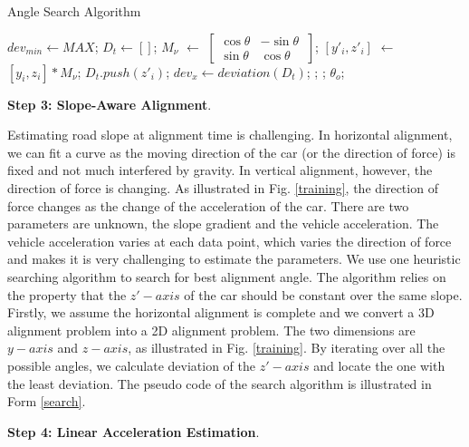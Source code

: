 \begin{algorithm}
\caption{Angle Search Algorithm}
\label{search}
\begin{algorithmic}[1]
\State $dev_{min} \gets MAX$;
\State $D_{t} \gets []$;
\State $M_\nu$ $\gets$ $\begin{bmatrix}\cos\theta & -\sin\theta\ \\ \sin\theta & \cos\theta \end{bmatrix}$;
\State $[y'_i,z'_i]$ $\gets$ $[y_i,z_i]* M_\nu$;
\State $D_t.push(z'_i)$;
\EndFor
\State $dev_x \gets deviation(D_t)$;
;
;
\EndIf
\EndFor
\Return $\theta_{o}$;
\EndProcedure
\end{algorithmic}
\end{algorithm}
\vspace{-0.6cm}


\textbf{Step 3: Slope-Aware Alignment}. 

Estimating road slope at alignment time is challenging. 
In horizontal alignment, we can fit a curve as the moving
direction of the car (or the direction of force) is fixed and not much interfered 
by gravity. 
In vertical alignment, however, the direction of force is changing. 
As illustrated in Fig. \ref{training}, the direction of force changes
as the change of the acceleration of the car. 
There are two parameters are unknown, the slope gradient 
and the vehicle acceleration. 
The vehicle acceleration varies at each data point, 
which varies the direction of force and makes it is very
challenging to estimate the parameters.
We use one heuristic searching algorithm to search for best alignment angle. 
The algorithm relies on the property that the $z'-axis$ of 
the car should be constant over the same slope. 
Firstly, we assume the horizontal alignment is complete and
we convert a 3D alignment problem into a 2D alignment problem. 
The two dimensions are $y-axis$ and $z-axis$, 
as illustrated in Fig. \ref{training}.
By iterating over all the possible angles, 
we calculate deviation of the $z'-axis$ and locate the one with the least deviation. 
The pseudo code of the search algorithm is illustrated in 
Form \ref{search}.




\textbf{Step 4: Linear Acceleration Estimation}.



